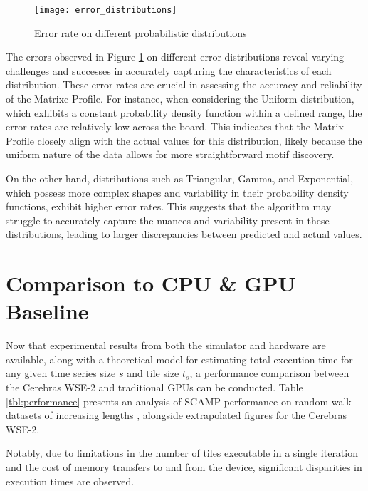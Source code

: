 \begin{figure}[h!]
    \texttt{[image: error\_distributions]}
    \centering
    \caption{Error rate on different probabilistic distributions}
    \label{fig:error_distribution}
\end{figure}

The errors observed in Figure \ref{fig:error_distribution} on different error distributions reveal varying challenges and successes in accurately capturing the characteristics of each distribution. These error rates are crucial in assessing the accuracy and reliability of the Matrixc Profile. For instance, when considering the Uniform distribution, which exhibits a constant probability density function within a defined range, the error rates are relatively low across the board. This indicates that the Matrix Profile closely align with the actual values for this distribution, likely because the uniform nature of the data allows for more straightforward motif discovery.

On the other hand, distributions such as Triangular, Gamma, and Exponential, which possess more complex shapes and variability in their probability density functions, exhibit higher error rates. This suggests that the algorithm may struggle to accurately capture the nuances and variability present in these distributions, leading to larger discrepancies between predicted and actual values.

\clearpage

\section{Comparison to CPU \& GPU Baseline} \label{section:comparison_to_cpu_gpu}
 
Now that experimental results from both the simulator and hardware are available, along with a theoretical model for estimating total execution time for any given time series size $s$ and tile size $t_s$, a performance comparison between the Cerebras WSE-2 and traditional GPUs can be conducted. Table \ref{tbl:performance} presents an analysis of SCAMP performance on random walk datasets of increasing lengths \cite{4}, alongside extrapolated figures for the Cerebras WSE-2. 

Notably, due to limitations in the number of tiles executable in a single iteration and the cost of memory transfers to and from the device, significant disparities in execution times are observed.

